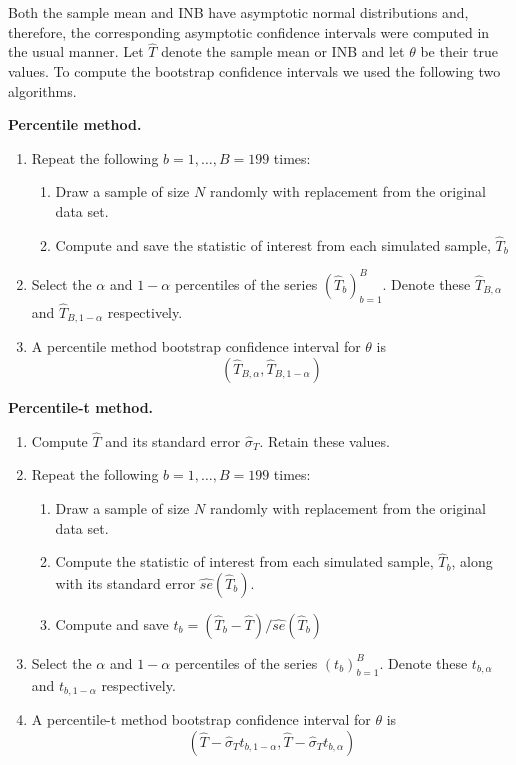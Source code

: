 \documentclass[english, 11pt,a4paper, ]{article}
\begin{document}
Both the sample mean and INB have asymptotic normal distributions and, therefore, the corresponding asymptotic confidence intervals were computed in the usual manner. Let $ \hat{T} $ denote the sample mean or INB and let $\theta $ be their true values. To compute the bootstrap confidence intervals we used the following two algorithms.


\noindent \textbf{Percentile method.}

\begin{enumerate}
	\item Repeat the following $ b=1,\ldots, B=199 $ times:
	
	\begin{enumerate}
		\item Draw a sample of size $ N $ randomly with replacement from the original data set.
		\item Compute and save the statistic of interest from each simulated sample,  $ \hat{T}_b $
	\end{enumerate}
	\item Select the $ \alpha $ and $ 1-\alpha $ percentiles of the series $ (\hat{T}_b)_{b=1}^B $. Denote these $ \hat{T}_{B,\alpha} $  and $ \hat{T}_{B,1-\alpha} $ respectively.
	\item A percentile method bootstrap confidence interval for $ \theta$ is
	\begin{equation}
	( \hat{T}_{B,\alpha},  \hat{T}_{B,1-\alpha}  )
	\end{equation}
\end{enumerate}


\noindent \textbf{Percentile-t method.}
\begin{enumerate}
	\item Compute $ \hat{T} $ and its standard error $ \hat{\sigma}_T$. Retain these values.
	\item Repeat the following  $ b=1,\ldots, B=199 $ times:
	\begin{enumerate}
		\item Draw a sample of size $ N $ randomly with replacement from the original data set.
		\item Compute the statistic of interest from each simulated sample,  $ \hat{T}_b $, along with its standard error $\hat{se}(\hat{T}_b)$.
		\item Compute and save $t_b= (\hat{T}_b -\hat{T})/\hat{se}(\hat{T}_b)$
	\end{enumerate}
	\item Select the $ \alpha $ and $ 1-\alpha $ percentiles of the series $ (t_b)_{b=1}^B $. Denote these $ t_{b,\alpha} $  and $ t_{b,1-\alpha} $ respectively.
	\item A percentile-t method bootstrap confidence interval for $ \theta $ is
	\newline
	\begin{equation}
	( \hat{T} - \hat{\sigma}_T t_{b,1-\alpha},  \hat{T} -  \hat{\sigma}_T t_{b,\alpha} )
	\end{equation}
\end{enumerate}
\end{document}
